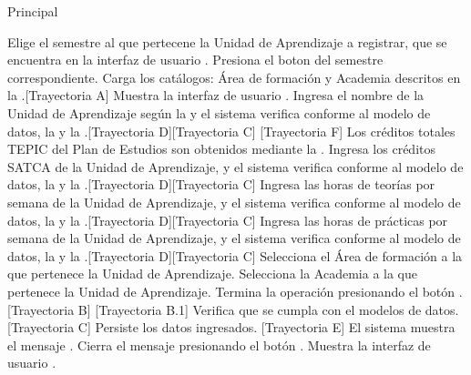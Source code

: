 \begin{UCtrayectoria}{Principal}

    \UCpaso[\UCactor] Elige el semestre al que pertecene la Unidad de Aprendizaje a registrar, que se encuentra en la interfaz de usuario .
    \UCpaso[\UCactor] Presiona el boton \IUbutton{+} del semestre correspondiente.
    \UCpaso Carga los catálogos: Área de formación y Academia descritos en la .[Trayectoria A]
    \UCpaso Muestra la interfaz de usuario .
    \UCpaso[\UCactor] Ingresa el nombre de la Unidad de Aprendizaje según la  y el sistema verifica conforme al modelo de datos, la  y la .[Trayectoria D][Trayectoria C] [Trayectoria F]
    \UCpaso Los créditos totales TEPIC del Plan de Estudios son obtenidos mediante la .
    \UCpaso[\UCactor] Ingresa los créditos SATCA de la Unidad de Aprendizaje, y el sistema verifica conforme al modelo de datos, la  y la .[Trayectoria D][Trayectoria C]
    \UCpaso[\UCactor] Ingresa las horas de teorías por semana de la Unidad de Aprendizaje, y el sistema verifica conforme al modelo de datos, la  y la .[Trayectoria D][Trayectoria C]
    \UCpaso[\UCactor] Ingresa las horas de prácticas por semana de la Unidad de Aprendizaje, y el sistema verifica conforme al modelo de datos, la  y la .[Trayectoria D][Trayectoria C]
    \UCpaso[\UCactor] Selecciona el Área de formación a la que pertenece la Unidad de Aprendizaje.
    \UCpaso[\UCactor] Selecciona la Academia a la que pertenece la Unidad de Aprendizaje.
    \UCpaso[\UCactor] Termina la operación presionando el botón . [Trayectoria B] [Trayectoria B.1]
    \UCpaso Verifica que se cumpla con el modelos de datos. [Trayectoria C]
    \UCpaso Persiste los datos ingresados. [Trayectoria E]
    \UCpaso El sistema muestra el mensaje .
    \UCpaso[\UCactor] Cierra el mensaje presionando el botón .
    \UCpaso Muestra la interfaz de usuario  .
\end{UCtrayectoria}


